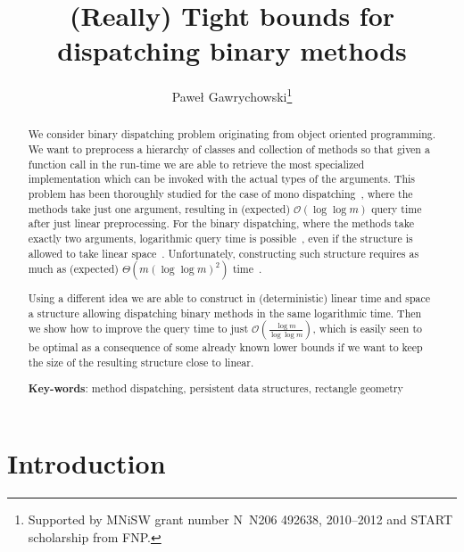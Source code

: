 \documentclass[runningheads]{llncs}
\begin{document}
\title{(Really) Tight bounds for dispatching binary methods}

\author{Pawe\l{} Gawrychowski\thanks{Supported by MNiSW grant number N~N206 492638, 2010--2012 and START scholarship from FNP.}}

\maketitle
\begin{abstract}
We consider binary dispatching problem originating from object oriented programming. We want to preprocess a hierarchy of classes and collection of methods so that given a function call in the run-time we are able to retrieve the most specialized implementation which can be invoked with the actual types of the arguments. This problem has been thoroughly studied for the case of mono dispatching~\cite{Muthukrishnan,FerraginaDynamic}, where the methods take just one argument, resulting in (expected) $\mathcal{O}(\log\log m)$ query time after just linear preprocessing. For the binary dispatching, where the methods take exactly two arguments, logarithmic query time is possible~\cite{Ferragina}, even if the structure is allowed to take linear space~\cite{Alstrup}. Unfortunately, constructing such structure requires as much as (expected) $\Theta(m(\log\log m)^2)$ time~\cite{Alstrup,Poon}.

Using a different idea we are able to construct in (deterministic) linear time and space a structure allowing dispatching binary methods in the same logarithmic time. Then we show how to improve the query time to just $\mathcal{O}(\frac{\log m}{\log\log m})$, which is easily seen to be optimal as a consequence of some already known lower bounds if we want to keep the size of the resulting structure close to linear.

\textbf{Key-words}: method dispatching, persistent data structures, rectangle geometry
\end{abstract}

\section{Introduction}
\end{document}
